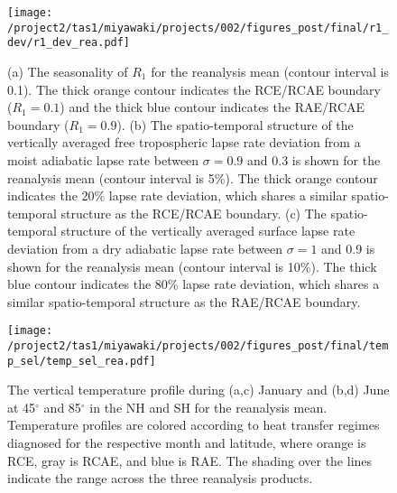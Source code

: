 \documentclass{ametsocV5}
\begin{document}
\begin{figure}[t]
  \noindent\texttt{[image: /project2/tas1/miyawaki/projects/002/figures\_post/final/r1\_dev/r1\_dev\_rea.pdf]}\\
  \caption{(a) The seasonality of $R_{1}$ for the reanalysis mean (contour interval is 0.1). The thick orange contour indicates the RCE/RCAE boundary ($R_1=0.1$) and the thick blue contour indicates the RAE/RCAE boundary ($R_1 = 0.9$). (b) The spatio-temporal structure of the vertically averaged free tropospheric lapse rate deviation from a moist adiabatic lapse rate between $\sigma=0.9$ and 0.3 is shown for the reanalysis mean (contour interval is 5\%). The thick orange contour indicates the 20\% lapse rate deviation, which shares a similar spatio-temporal structure as the RCE/RCAE boundary. (c) The spatio-temporal structure of the vertically averaged surface lapse rate deviation from a dry adiabatic lapse rate between $\sigma=1$ and 0.9 is shown for the reanalysis mean (contour interval is 10\%). The thick blue contour indicates the 80\% lapse rate deviation, which shares a similar spatio-temporal structure as the RAE/RCAE boundary.}
  \label{fig:rea-r1-dev}
\end{figure}

\begin{figure}[t]
  \noindent\texttt{[image: /project2/tas1/miyawaki/projects/002/figures\_post/final/temp\_sel/temp\_sel\_rea.pdf]}\\
  \caption{The vertical temperature profile during (a,c) January and (b,d) June at 45$^{\circ}$ and 85$^{\circ}$ in the NH and SH for the reanalysis mean. Temperature profiles are colored according to heat transfer regimes diagnosed for the respective month and latitude, where orange is RCE, gray is RCAE, and blue is RAE. The shading over the lines indicate the range across the three reanalysis products.}
  \label{fig:rea-temp-sel}
\end{figure}

\end{document}
